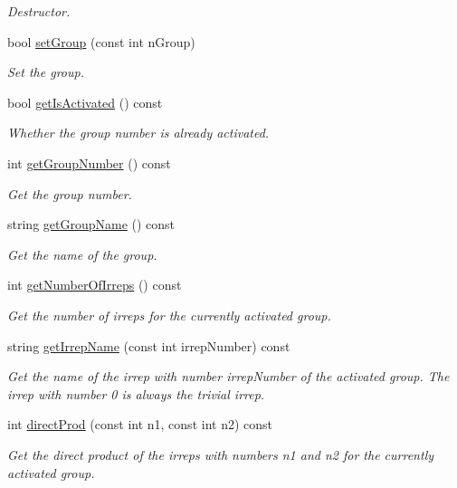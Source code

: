 \begin{DoxyCompactItemize}
\begin{DoxyCompactList}\small\item\em Destructor. \end{DoxyCompactList}\item 
bool \hyperlink{classCheMPS2_1_1Irreps_aca6fdd79557f9189153258daad5fbe8c}{set\-Group} (const int n\-Group)
\begin{DoxyCompactList}\small\item\em Set the group. \end{DoxyCompactList}\item 
bool \hyperlink{classCheMPS2_1_1Irreps_a4417e98f495d58ac530c73366667e1ae}{get\-Is\-Activated} () const 
\begin{DoxyCompactList}\small\item\em Whether the group number is already activated. \end{DoxyCompactList}\item 
int \hyperlink{classCheMPS2_1_1Irreps_a9813550797b0557cf22d2bca5f3e07b0}{get\-Group\-Number} () const 
\begin{DoxyCompactList}\small\item\em Get the group number. \end{DoxyCompactList}\item 
string \hyperlink{classCheMPS2_1_1Irreps_aa56e8dea52881f0c86c348539b21bb5c}{get\-Group\-Name} () const 
\begin{DoxyCompactList}\small\item\em Get the name of the group. \end{DoxyCompactList}\item 
int \hyperlink{classCheMPS2_1_1Irreps_afd3d1b65e870aad920125c05606c4a7d}{get\-Number\-Of\-Irreps} () const 
\begin{DoxyCompactList}\small\item\em Get the number of irreps for the currently activated group. \end{DoxyCompactList}\item 
string \hyperlink{classCheMPS2_1_1Irreps_acc6050a0690e8e940f9de7cf312bbac4}{get\-Irrep\-Name} (const int irrep\-Number) const 
\begin{DoxyCompactList}\small\item\em Get the name of the irrep with number irrep\-Number of the activated group. The irrep with number 0 is always the trivial irrep. \end{DoxyCompactList}\item 
int \hyperlink{classCheMPS2_1_1Irreps_af639c441270cd0762cb68479ee6a82a6}{direct\-Prod} (const int n1, const int n2) const 
\begin{DoxyCompactList}\small\item\em Get the direct product of the irreps with numbers n1 and n2 for the currently activated group. \end{DoxyCompactList}\end{DoxyCompactItemize}
